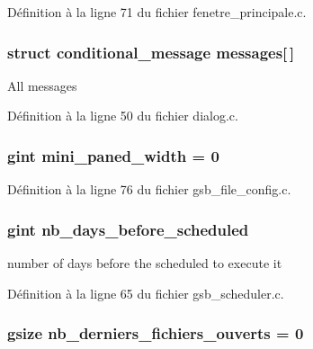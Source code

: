 Définition à la ligne 71 du fichier fenetre\_\-principale.c.

\subsubsection[{messages}]{\setlength{\rightskip}{0pt plus 5cm}struct {\bf conditional\_\-message} {\bf messages}[$\,$]}\label{gsb__file__config_8c_a430b9f94c0af809780196ca7d7040fde}
All messages 

Définition à la ligne 50 du fichier dialog.c.

\subsubsection[{mini\_\-paned\_\-width}]{\setlength{\rightskip}{0pt plus 5cm}gint {\bf mini\_\-paned\_\-width} = 0}\label{gsb__file__config_8c_aeedb26129c4cdb0718946b03abf8b0d5}


Définition à la ligne 76 du fichier gsb\_\-file\_\-config.c.

\subsubsection[{nb\_\-days\_\-before\_\-scheduled}]{\setlength{\rightskip}{0pt plus 5cm}gint {\bf nb\_\-days\_\-before\_\-scheduled}}\label{gsb__file__config_8c_ab4baae80534027ea3fe73d417c48caaa}
number of days before the scheduled to execute it 

Définition à la ligne 65 du fichier gsb\_\-scheduler.c.

\subsubsection[{nb\_\-derniers\_\-fichiers\_\-ouverts}]{\setlength{\rightskip}{0pt plus 5cm}gsize {\bf nb\_\-derniers\_\-fichiers\_\-ouverts} = 0}\label{gsb__file__config_8c_a602b7cdee2b4750d17e89e642189e6ba}



